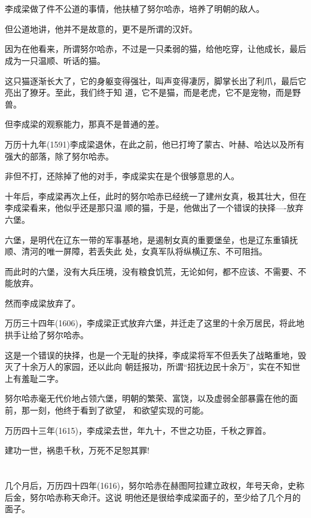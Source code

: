 \documentclass[11pt,a4paper,onecolumn]{article}
\begin{document}
\section[\thesection]{}

李成梁做了件不公道的事情，他扶植了努尔哈赤，培养了明朝的敌人。

但公道地讲，他并不是故意的，更不是所谓的汉奸。

因为在他看来，所谓努尔哈赤，不过是一只柔弱的猫，给他吃穿，让他成长，最后成为一只温顺、听话的猫。

这只猫逐渐长大了，它的身躯变得强壮，叫声变得凄厉，脚掌长出了利爪，最后它亮出了獠牙。至此，我们终于知
道，它不是猫，而是老虎，它不是宠物，而是野兽。

但李成梁的观察能力，那真不是普通的差。

万历十九年(1591)李成梁退休，在此之前，他已打垮了蒙古、叶赫、哈达以及所有强大的部落，除了努尔哈赤。

非但不打，还除掉了他的对手，李成梁实在是个很够意思的人。

十年后，李成梁再次上任，此时的努尔哈赤已经统一了建州女真，极其壮大，但在李成梁看来，他似乎还是那只温
顺的猫，于是，他做出了一个错误的抉择----放弃六堡。

六堡，是明代在辽东一带的军事基地，是遏制女真的重要堡垒，也是辽东重镇抚顺、清河的唯一屏障，若丢失此
处，女真军队将纵横辽东、不可阻挡。

而此时的六堡，没有大兵压境，没有粮食饥荒，无论如何，都不应该、不需要、不能放弃。

然而李成梁放弃了。

万历三十四年(1606)，李成梁正式放弃六堡，并迁走了这里的十余万居民，将此地拱手让给了努尔哈赤。

这是一个错误的抉择，也是一个无耻的抉择，李成梁将军不但丢失了战略重地，毁灭了十余万人的家园，还以此向
朝廷报功，所谓``招抚边民十余万''，实在不知世上有羞耻二字。

努尔哈赤毫无代价地占领六堡，明朝的繁荣、富饶，以及虚弱全部暴露在他的面前，那一刻，他终于看到了欲望，
和欲望实现的可能。

万历四十三年(1615)，李成梁去世，年九十，不世之功臣，千秋之罪首。

建功一世，祸患千秋，万死不足恕其罪!

\section[\thesection]{}

几个月后，万历四十四年(1616)，努尔哈赤在赫图阿拉建立政权，年号天命，史称后金，努尔哈赤称天命汗。这说
明他还是很给李成梁面子的，至少给了几个月的面子。
\end{document}
